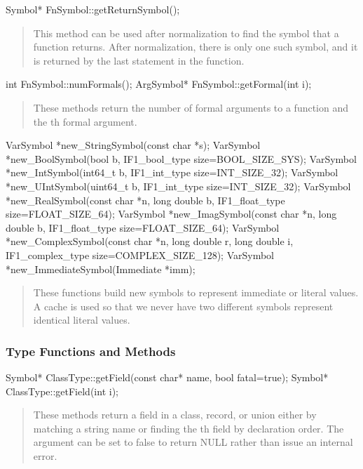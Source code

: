 \documentclass[10pt]{article}
\begin{document}
\begin{clang}
Symbol* FnSymbol::getReturnSymbol();
\end{clang}
\begin{quote}
This method can be used after normalization to find the symbol that a
function returns.  After normalization, there is only one such symbol,
and it is returned by the last statement in the function.
\end{quote}

\begin{clang}
int FnSymbol::numFormals();
ArgSymbol* FnSymbol::getFormal(int i);
\end{clang}
\begin{quote}
These methods return the number of formal arguments to a function and
the th formal argument.
\end{quote}

\begin{clang}
VarSymbol *new_StringSymbol(const char *s);
VarSymbol *new_BoolSymbol(bool b, IF1_bool_type size=BOOL_SIZE_SYS);
VarSymbol *new_IntSymbol(int64_t b, IF1_int_type size=INT_SIZE_32);
VarSymbol *new_UIntSymbol(uint64_t b, IF1_int_type size=INT_SIZE_32);
VarSymbol *new_RealSymbol(const char *n, long double b, IF1_float_type size=FLOAT_SIZE_64);
VarSymbol *new_ImagSymbol(const char *n, long double b, IF1_float_type size=FLOAT_SIZE_64);
VarSymbol *new_ComplexSymbol(const char *n, long double r, long double i, IF1_complex_type size=COMPLEX_SIZE_128);
VarSymbol *new_ImmediateSymbol(Immediate *imm);
\end{clang}
\begin{quote}
These functions build new symbols to represent immediate or literal
values.  A cache is used so that we never have two different symbols
represent identical literal values.
\end{quote}

\subsubsection{Type Functions and Methods}

\begin{clang}
Symbol* ClassType::getField(const char* name, bool fatal=true);
Symbol* ClassType::getField(int i);
\end{clang}
\begin{quote}
These methods return a field in a class, record, or union either by
matching a string name or finding the th field by declaration
order.  The argument  can be set to false to return NULL
rather than issue an internal error.
\end{quote}
\end{document}
